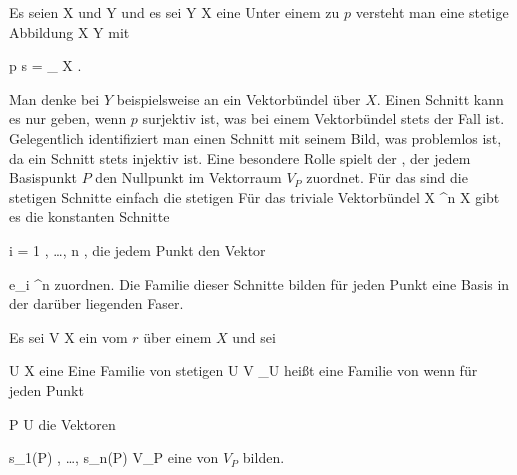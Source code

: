 {}
{

Es seien
\mathkor {} {X} {und} {Y} {}
und es sei
 { Y } { X
} {}
eine
Unter einem
zu $p$ versteht man eine stetige Abbildung
 { X } { Y
} {}
mit

\mavergleichskettedisp
{\vergleichskette
{  p \circ s
}
{ =} {
_{  X  }
}
{ } {
}
{ } {
}
{ } {
}
}
{}{}{.}

}
Man denke bei $Y$ beispielsweise an ein Vektorbündel über $X$. Einen Schnitt kann es nur geben, wenn $p$ surjektiv ist, was bei einem Vektorbündel stets der Fall ist. Gelegentlich identifiziert man einen Schnitt mit seinem Bild, was problemlos ist, da ein Schnitt stets injektiv ist. Eine besondere Rolle spielt der  {,} der jedem Basispunkt $P$ den Nullpunkt im Vektorraum $V_P$ zuordnet.
Für das
sind die stetigen Schnitte einfach die stetigen
Für das triviale Vektorbündel
\maabbdisp {} {X \times \R^n } { X
} {}
gibt es die konstanten Schnitte

 {}
 {i = 1 , \ldots , n} {}
 {} {} {} {,}
die jedem Punkt den Vektor

\mavergleichskette
{\vergleichskette
{ e_i
}
{ \in }{ \R^n
}
{  }{
}
{    }{
}
{   }{
}
}
{}{}{}
zuordnen. Die Familie dieser Schnitte bilden für jeden Punkt eine Basis in der darüber liegenden Faser.

Es sei
 { V } { X
} {}
ein
vom
$r$ über einem
$X$ und sei

\mavergleichskette
{\vergleichskette
{ U
}
{ \subseteq }{ X
}
{  }{
}
{    }{
}
{   }{
}
}
{}{}{}
eine
Eine Familie von stetigen
 { U} {V  \vert_U
} {}
heißt eine Familie von
wenn für jeden Punkt

\mavergleichskette
{\vergleichskette
{ P
}
{ \in }{ U
}
{  }{
}
{    }{
}
{   }{
}
}
{}{}{}
die Vektoren

\mavergleichskette
{\vergleichskette
{ s_1(P)  , \ldots , s_n(P)
}
{ \in }{ V_P
}
{  }{
}
{    }{
}
{   }{
}
}
{}{}{}
eine
von $V_P$ bilden.

